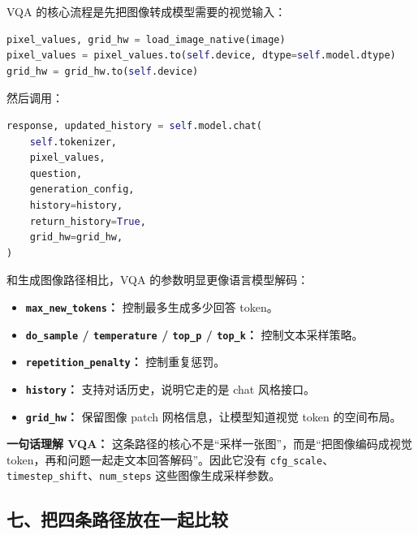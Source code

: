VQA 的核心流程是先把图像转成模型需要的视觉输入：

\begin{lstlisting}[language=Python]
pixel_values, grid_hw = load_image_native(image)
pixel_values = pixel_values.to(self.device, dtype=self.model.dtype)
grid_hw = grid_hw.to(self.device)
\end{lstlisting}

然后调用：

\begin{lstlisting}[language=Python]
response, updated_history = self.model.chat(
    self.tokenizer,
    pixel_values,
    question,
    generation_config,
    history=history,
    return_history=True,
    grid_hw=grid_hw,
)
\end{lstlisting}

和生成图像路径相比，VQA 的参数明显更像语言模型解码：

\begin{itemize}[leftmargin=1.5em]
  \item \textbf{\texttt{max\_new\_tokens}：} 控制最多生成多少回答 token。
  \item \textbf{\texttt{do\_sample} / \texttt{temperature} / \texttt{top\_p} / \texttt{top\_k}：} 控制文本采样策略。
  \item \textbf{\texttt{repetition\_penalty}：} 控制重复惩罚。
  \item \textbf{\texttt{history}：} 支持对话历史，说明它走的是 chat 风格接口。
  \item \textbf{\texttt{grid\_hw}：} 保留图像 patch 网格信息，让模型知道视觉 token 的空间布局。
\end{itemize}

\begin{summarybox}
\textbf{一句话理解 VQA：} 这条路径的核心不是“采样一张图”，而是“把图像编码成视觉 token，再和问题一起走文本回答解码”。因此它没有 \texttt{cfg\_scale}、\texttt{timestep\_shift}、\texttt{num\_steps} 这些图像生成采样参数。
\end{summarybox}

\subsection{七、把四条路径放在一起比较}

